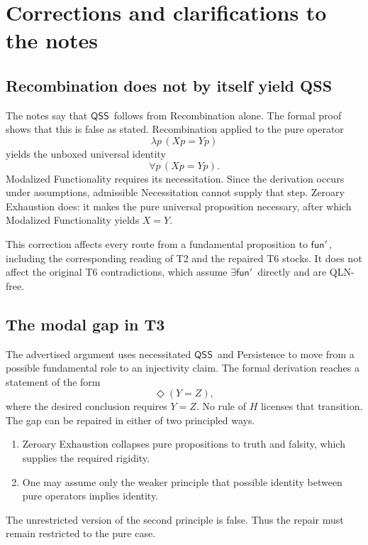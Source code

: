 \documentclass[12pt,leqno]{article}
\theoremstyle{plain}
\theoremstyle{definition}
\newcommand{\funp}{\ensuremath{\mathsf{fun}'\,}}
\newcommand{\QSS}{\ensuremath{\mathsf{QSS}}}
\begin{document}
\section{Corrections and clarifications to the notes}

\subsection{Recombination does not by itself yield QSS}

The notes say that \QSS\ follows from Recombination alone.  The formal proof
shows that this is false as stated.  Recombination applied to the pure
operator
\[
 \lambda p\,(Xp=Yp)
\]
yields the unboxed universal identity
\[
 \forall p\,(Xp=Yp).
\]
Modalized Functionality requires its necessitation.  Since the derivation
occurs under assumptions, admissible Necessitation cannot supply that step.
Zeroary Exhaustion does: it makes the pure universal proposition necessary,
after which Modalized Functionality yields \(X=Y\).

This correction affects every route from a fundamental proposition to
\(\funp\), including the corresponding reading of T2 and the repaired T6
stocks.  It does not affect the original T6 contradictions, which assume
\(\exists\funp\) directly and are QLN-free.

\subsection{The modal gap in T3}

The advertised argument uses necessitated \QSS\ and Persistence to move from a
possible fundamental role to an injectivity claim.  The formal derivation
reaches a statement of the form
\[
 \Diamond(Y=Z),
\]
where the desired conclusion requires \(Y=Z\).  No rule of \(H\) licenses
that transition.  The gap can be repaired in either of two principled ways.

\begin{enumerate}
\item Zeroary Exhaustion collapses pure propositions to truth and falsity,
      which supplies the required rigidity.
\item One may assume only the weaker principle that possible identity between
      pure operators implies identity.
\end{enumerate}

\noindent
The unrestricted version of the second principle is false.  Thus the repair
must remain restricted to the pure case.
\end{document}
